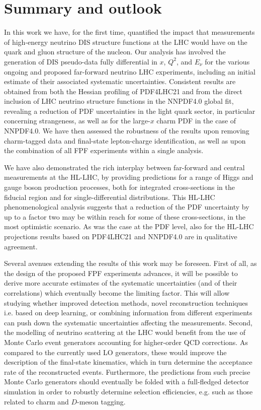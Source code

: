 \section{Summary and outlook}
\label{sec:summary}

In this work we have, for the first time,
quantified the impact that measurements of high-energy
neutrino DIS structure functions at the LHC would have on the quark
and gluon structure of the nucleon.
%
Our analysis has involved the generation of
DIS pseudo-data fully differential in $x$, $Q^2$, and $E_\nu$
for the various ongoing and proposed far-forward
neutrino LHC experiments, including an initial estimate
of their associated systematic uncertainties.
%
Consistent results are obtained from both the Hessian profiling
of PDF4LHC21 and from the direct inclusion of LHC neutrino
structure functions in the NNPDF4.0 global
fit, revealing a reduction of PDF uncertainties in the
light quark sector, in particular concerning strangeness, as well
as for the large-$x$ charm PDF in the case of NNPDF4.0.
%
We have then assessed the  robustness of the results upon
removing charm-tagged data and final-state lepton-charge
identification, as well as upon the combination
of all FPF experiments within a single analysis.

We have also demonstrated the rich interplay between
far-forward and central measurements
at the HL-LHC, by providing predictions
for a range of Higgs and gauge boson production processes,
both for integrated cross-sections in the fiducial region and for
single-differential distributions.
%
This HL-LHC phenomenological analysis suggests that a reduction
of the  PDF uncertainty by up to a factor two
may be within reach for some of these cross-sections,
in the most optimistic scenario.
%
As was the case at the PDF level, also for 
the HL-LHC projections results based on  PDF4LHC21 and NNPDF4.0
are in qualitative agreement.

Several avenues extending the results of this work may be foreseen.
%
First of all, as the design of the proposed FPF experiments
 advances, it will be possible to derive
 more accurate estimates of the systematic
uncertainties (and of their correlations) 
which eventually become the limiting factor.
%
This will allow studying whether  improved detection methods,
novel reconstruction techniques i.e. based
on deep learning, or combining information from different
experiments can  push down the systematic uncertainties
affecting the measurements.
%
Second, the modelling of neutrino scattering at the LHC would benefit from
the use of Monte Carlo event generators accounting
for higher-order QCD corrections.
%
As compared to the currently used LO generators,
these would improve the description of the final-state
kinematics, which in turn determine the acceptance rate
of the reconstructed events.
%
Furthermore, the predictions from such precise Monte Carlo generators
should eventually be folded with a full-fledged detector simulation
in order to robustly determine selection efficiencies, e.g.
such as those related to charm and $D$-meson tagging.

